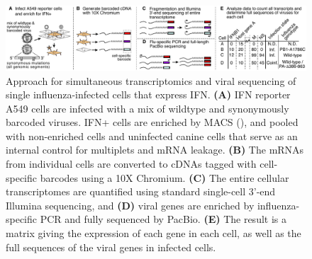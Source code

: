 \documentclass[9pt,lineno]{elife}
\begin{document}
\begin{figure}
\begin{fullwidth}

\includegraphics[width=\linewidth, valign=t]{figures/WorkflowSchematic/SchematicForPaper.pdf}

\caption{
Approach for simultaneous transcriptomics and viral sequencing of single influenza-infected cells that express IFN.
{\bf (A)}
IFN reporter A549 cells are infected with a mix of wildtype and synonymously barcoded viruses.
IFN+ cells are enriched by MACS (), and pooled with non-enriched cells and uninfected canine cells that serve as an internal control for multiplets and mRNA leakage.
{\bf (B)}
The mRNAs from individual cells are converted to cDNAs tagged with cell-specific barcodes using a 10X Chromium.
{\bf (C)}
The entire cellular transcriptomes are quantified using standard single-cell 3'-end Illumina sequencing, and 
{\bf (D)}
viral genes are enriched by influenza-specific PCR and fully sequenced by PacBio.
{\bf (E)}
The result is a matrix giving the expression of each gene in each cell, as well as the full sequences of the viral genes in infected cells.
}
\label{fig:workflow}


\end{fullwidth}
\end{figure}
\end{document}

